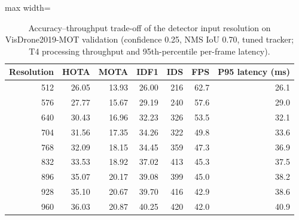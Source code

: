 \begin{table}[tbp]
\centering
\caption{Accuracy--throughput trade-off of the detector input resolution on VisDrone2019-MOT validation (confidence 0.25, NMS IoU 0.70, tuned tracker; T4 processing throughput and 95th-percentile per-frame latency).}
\label{tab:ch4-speed}
\small\setlength{\tabcolsep}{4pt}
\begin{adjustbox}{max width=\textwidth}
\begin{tabular}{rrrrrrr}
\hline
Resolution & HOTA & MOTA & IDF1 & IDS & FPS & P95 latency (ms) \\
\hline
512 & 26.05 & 13.93 & 26.00 & 216 & 62.7 & 26.1 \\
576 & 27.77 & 15.67 & 29.19 & 240 & 57.6 & 29.0 \\
640 & 30.43 & 16.96 & 32.23 & 326 & 53.5 & 32.1 \\
704 & 31.56 & 17.35 & 34.26 & 322 & 49.8 & 33.6 \\
768 & 32.09 & 18.15 & 34.45 & 359 & 47.3 & 36.9 \\
832 & 33.53 & 18.92 & 37.02 & 413 & 45.3 & 37.5 \\
896 & 35.07 & 20.17 & 39.08 & 399 & 45.0 & 38.2 \\
928 & 35.10 & 20.67 & 39.70 & 416 & 42.9 & 38.6 \\
960 & 36.03 & 20.87 & 40.25 & 420 & 42.0 & 40.9 \\
\hline
\end{tabular}
\end{adjustbox}
\end{table}
